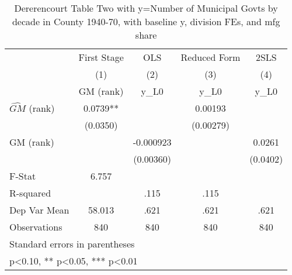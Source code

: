 \begin{table}[htbp]\centering
\def\sym#1{\ifmmode^{#1}\else\(^{#1}\)\fi}
\caption{Dererencourt Table Two with y=Number of Municipal Govts by decade in County 1940-70, with baseline y, division FEs, and mfg share}
\begin{tabular}{l*{4}{c}}
\toprule
                    & First Stage   &         OLS   &Reduced Form   &        2SLS   \\
                    &\multicolumn{1}{c}{(1)}&\multicolumn{1}{c}{(2)}&\multicolumn{1}{c}{(3)}&\multicolumn{1}{c}{(4)}\\
                    &\multicolumn{1}{c}{GM  (rank)}&\multicolumn{1}{c}{y\_L0}&\multicolumn{1}{c}{y\_L0}&\multicolumn{1}{c}{y\_L0}\\
\midrule
$\hat{GM}$ (rank)   &      0.0739** &               &     0.00193   &               \\
                    &    (0.0350)   &               &   (0.00279)   &               \\
\addlinespace
GM  (rank)          &               &   -0.000923   &               &      0.0261   \\
                    &               &   (0.00360)   &               &    (0.0402)   \\
\midrule
F-Stat              &       6.757   &               &               &               \\
R-squared           &               &        .115   &        .115   &               \\
Dep Var Mean        &      58.013   &        .621   &        .621   &        .621   \\
Observations        &         840   &         840   &         840   &         840   \\
\bottomrule
\multicolumn{5}{l}{\footnotesize Standard errors in parentheses}\\
\multicolumn{5}{l}{\footnotesize * p<0.10, ** p<0.05, *** p<0.01}\\
\end{tabular}
\end{table}
